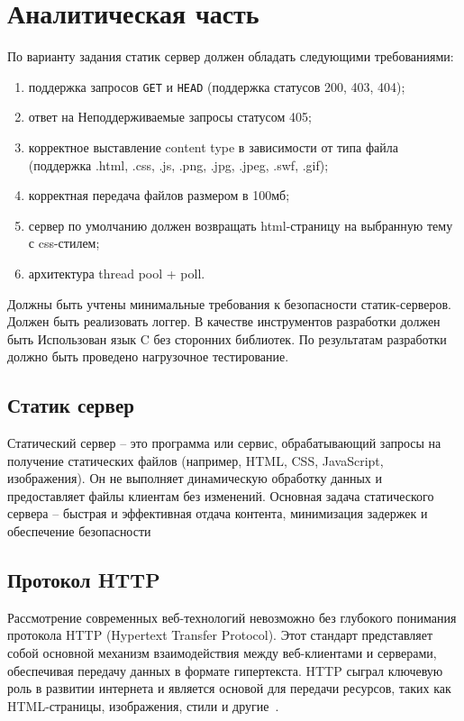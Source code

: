 
\section{Аналитическая часть}

По варианту задания статик сервер должен обладать следующими требованиями:
\begin{enumerate}
	\item поддержка запросов \texttt{GET} и \texttt{HEAD} (поддержка статусов 200, 403, 404);
	\item ответ на Неподдерживаемые запросы статусом 405;
	\item корректное выставление content type в зависимости от типа файла (поддержка .html, .css, .js, .png, .jpg, .jpeg, .swf, .gif);
	\item корректная передача файлов размером в 100мб;
	\item сервер по умолчанию должен возвращать html-страницу на выбранную тему с css-стилем;
	\item архитектура thread pool + poll.
\end{enumerate}

Должны быть учтены минимальные требования к безопасности статик-серверов. Должен быть реализовать логгер. В качестве инструментов разработки должен быть Использован язык C без сторонних библиотек. По результатам разработки должно быть проведено нагрузочное тестирование.

\subsection{Статик сервер}

Статический сервер -- это программа или сервис, обрабатывающий запросы на получение статических файлов (например, HTML, CSS, JavaScript, изображения). Он не выполняет динамическую обработку данных и предоставляет файлы клиентам без изменений. Основная задача статического сервера -- быстрая и эффективная отдача контента, минимизация задержек и обеспечение безопасности

\subsection{Протокол HTTP}

Рассмотрение современных веб-технологий невозможно без глубокого понимания протокола HTTP (Hypertext Transfer Protocol). 
Этот стандарт представляет собой основной механизм взаимодействия между веб-клиентами и серверами, обеспечивая передачу данных в формате гипертекста. 
HTTP сыграл ключевую роль в развитии интернета и является основой для передачи ресурсов, таких как HTML-страницы, изображения, стили и другие~\cite{cn}.

